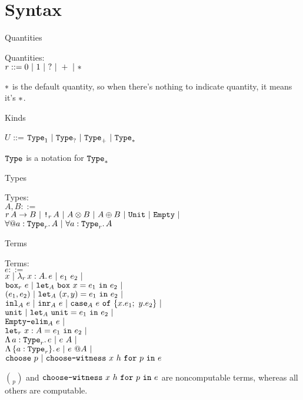 \section{Syntax}

\begin{frame}{Quantities}

Quantities: \\
$r ::= 0 \ |\  1 \ |\  ? \ |\  + \ |\  *$

\vspace{2em}

$*$ is the default quantity, so when there's nothing to indicate quantity, it means it's $*$.

\end{frame}

\begin{frame}{Kinds}

$U$ ::= $\Type[\One] \pipe \Type[\Few] \pipe \Type[\Many] \pipe \Type[\Any]$

\vspace{2em}

$\Type$ is a notation for $\Type[\Any]$

\end{frame}

\begin{frame}{Types}

Types: \\
$A, B ::=$ \\
\qquad $\Fun[r]{A}{B} \pipe \Box[r]{A} \pipe \Prod{A}{B} \pipe \Sum{A}{B} \pipe \Unit \pipe \Empty \pipe$ \\
\qquad $\ForallE{a}[r]{A} \pipe \ForallI{a}[r]{A}$

\end{frame}

\begin{frame}{Terms}

Terms: \\
$e ::=$ \\
\qquad $x \pipe \fun[r]{x}[A]{e} \pipe \app{e_1}{e_2} \pipe$ \\
\qquad $\boxintro[r]{e} \pipe \boxelim{x}{e_1}{e_2}[A] \pipe$ \\
\qquad $\pair{e_1}{e_2} \pipe \letpair{x}{y}{e_1}{e_2}[A] \pipe$ \\
\qquad $\inl[A]{e} \pipe \inr[A]{e} \pipe \newcase{e}{x}{e_1}{y}{e_2}[A] \pipe$ \\
\qquad $\unit \pipe \unitelim{e_1}{e_2}[A] \pipe$ \\
\qquad $\emptyelim{e}[A] \pipe$ \\
\qquad $\letin[r]{x}[A]{e_1}{e_2} \pipe$ \\
\qquad $\tfun{a}[r]{e} \pipe \tapp{e}{A} \pipe$ \\
\qquad $\itfun{a}[r]{e} \pipe \itapp{e}{A} \pipe$ \\
\qquad $\texttt{choose}\ p \ |\  \texttt{choose-witness}\ x\ h\ \texttt{for}\ p\ \texttt{in}\ e$

\vspace{1em}

$\choose{p}$ and $\texttt{choose-witness}\ x\ h\ \texttt{for}\ p\ \texttt{in}\ e$ are noncomputable terms, whereas all others are computable.

\end{frame}

